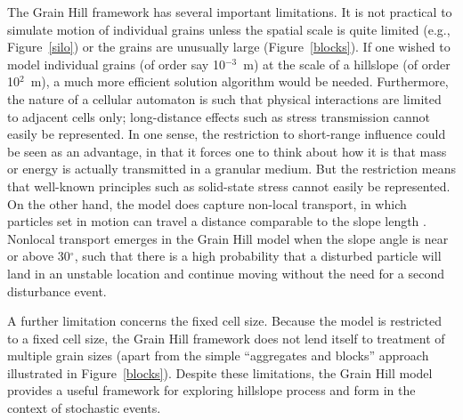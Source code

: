 \documentclass[esurf, manuscript]{copernicus}
\begin{document}
The Grain Hill framework has several important limitations. It is not practical to simulate motion of individual grains unless the spatial scale is quite limited (e.g., Figure~\ref{silo}) or the grains are unusually large (Figure~\ref{blocks}). If one wished to model individual grains (of order say 10$^{-3}$~m) at the scale of a hillslope (of order 10$^2$~m), a much more efficient solution algorithm would be needed. Furthermore, the nature of a cellular automaton is such that physical interactions are limited to adjacent cells only; long-distance effects such as stress transmission cannot easily be represented. In one sense, the restriction to short-range influence could be seen as an advantage, in that it forces one to think about how it is that mass or energy is actually transmitted in a granular medium. But the restriction means that well-known principles such as solid-state stress cannot easily be represented. On the other hand, the model does capture non-local transport, in which particles set in motion can travel a distance comparable to the slope length \citep{foufoula2010nonlocal,tucker2010trouble,furbish2013sediment}. Nonlocal transport emerges in the Grain Hill model when the slope angle is near or above 30$^\circ$, such that there is a high probability that a disturbed particle will land in an unstable location and continue moving without the need for a second disturbance event.


A further limitation concerns the fixed cell size. Because the model is restricted to a fixed cell size, the Grain Hill framework does not lend itself to treatment of multiple grain sizes (apart from the simple ``aggregates and blocks'' approach illustrated in Figure~\ref{blocks}). Despite these limitations, the Grain Hill model provides a useful framework for exploring hillslope process and form in the context of stochastic events.
\end{document}
